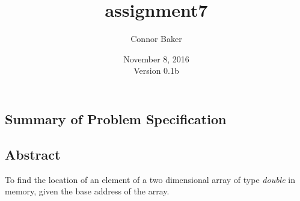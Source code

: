 \documentclass[12pt]{article}
\begin{document}
\null
\nointerlineskip 
\vfill
\let \snewpage \newpage
\let \newpage \relax
    \title{assignment7}
    \author{Connor Baker}
    \date{November 8, 2016\\Version 0.1b}
\maketitle
\let \newpage \snewpage
\vfill
\thispagestyle{empty}



\newpage %



\makeatletter
{}
\renewcommand*\l@section{\@dottedtocline{1}{0em}{1.5em}}
\makeatother
\tableofcontents

\clearpage
{}

\begin{center}
\section{Summary of Problem Specification}
\end{center}
\subsection{Abstract}
To find the location of an element of a two dimensional array of type \textit{double} in memory, given the base address of the array.
\end{document}
